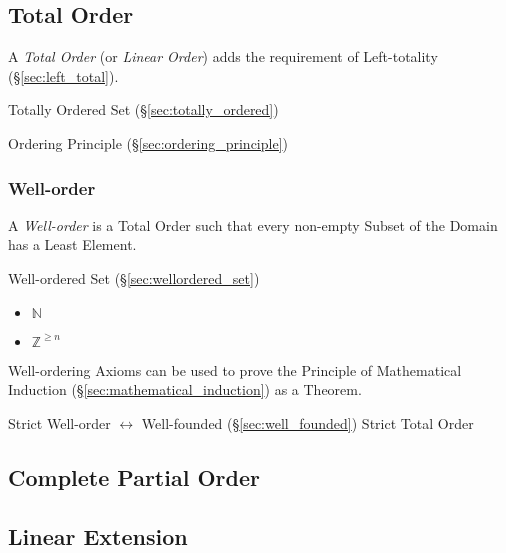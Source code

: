 \subsection{Total Order}\label{sec:total_order}

A \emph{Total Order} (or \emph{Linear Order}) adds the requirement of
Left-totality (\S\ref{sec:left_total}).

Totally Ordered Set (\S\ref{sec:totally_ordered})

Ordering Principle (\S\ref{sec:ordering_principle})



\subsubsection{Well-order}\label{sec:well_order}

A \emph{Well-order} is a Total Order such that every non-empty Subset
of the Domain has a Least Element.

Well-ordered Set (\S\ref{sec:wellordered_set})

\begin{itemize}
  \item $\mathbb{N}$
  \item $\mathbb{Z}^{\geq n}$
\end{itemize}

Well-ordering Axioms can be used to prove the Principle of
Mathematical Induction (\S\ref{sec:mathematical_induction}) as a
Theorem.

Strict Well-order $\leftrightarrow$ Well-founded
(\S\ref{sec:well_founded}) Strict Total Order



\subsection{Complete Partial Order}\label{sec:complete_partialorder}

\subsection{Linear Extension}\label{sec:linear_extension}

